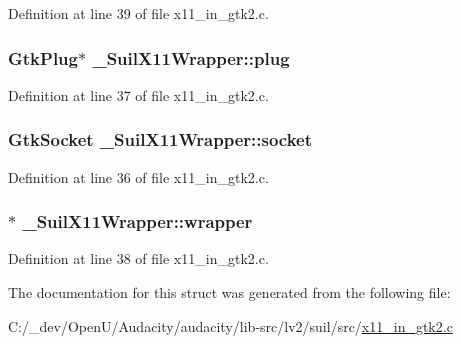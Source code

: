 Definition at line 39 of file x11\+\_\+in\+\_\+gtk2.\+c.

\subsubsection[{\texorpdfstring{plug}{plug}}]{\setlength{\rightskip}{0pt plus 5cm}Gtk\+Plug$\ast$ \+\_\+\+Suil\+X11\+Wrapper\+::plug}\hypertarget{struct___suil_x11_wrapper_a99d6a748bc346bc993e501221e140b36}{}\label{struct___suil_x11_wrapper_a99d6a748bc346bc993e501221e140b36}


Definition at line 37 of file x11\+\_\+in\+\_\+gtk2.\+c.

\subsubsection[{\texorpdfstring{socket}{socket}}]{\setlength{\rightskip}{0pt plus 5cm}Gtk\+Socket \+\_\+\+Suil\+X11\+Wrapper\+::socket}\hypertarget{struct___suil_x11_wrapper_a829d5369d7deca397e7966dc63051556}{}\label{struct___suil_x11_wrapper_a829d5369d7deca397e7966dc63051556}


Definition at line 36 of file x11\+\_\+in\+\_\+gtk2.\+c.

\subsubsection[{\texorpdfstring{wrapper}{wrapper}}]{$\ast$ \+\_\+\+Suil\+X11\+Wrapper\+::wrapper}\hypertarget{struct___suil_x11_wrapper_afdcc329c36173288f2e6e61914daf7d5}{}\label{struct___suil_x11_wrapper_afdcc329c36173288f2e6e61914daf7d5}


Definition at line 38 of file x11\+\_\+in\+\_\+gtk2.\+c.



The documentation for this struct was generated from the following file\+:\begin{DoxyCompactItemize}
\item 
C\+:/\+\_\+dev/\+Open\+U/\+Audacity/audacity/lib-\/src/lv2/suil/src/\hyperlink{x11__in__gtk2_8c}{x11\+\_\+in\+\_\+gtk2.\+c}\end{DoxyCompactItemize}
